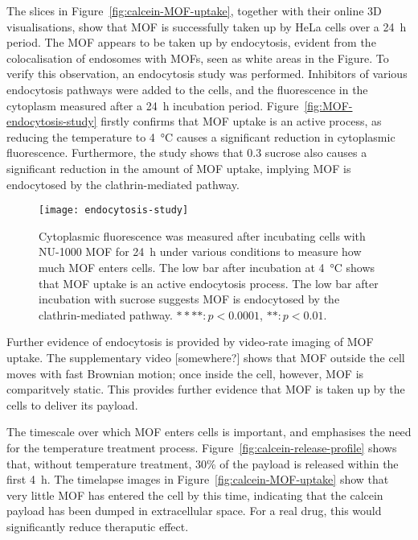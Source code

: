 The slices in Figure~\ref{fig:calcein-MOF-uptake}, together with their online 3D visualisations, show that MOF is successfully taken up by HeLa cells over a \SI{24}{\hour} period. 
The MOF appears to be taken up by endocytosis, evident from the colocalisation of endosomes with MOFs, seen as white areas in the Figure. 
To verify this observation, an endocytosis study was performed.
Inhibitors of various endocytosis pathways were added to the cells, and the fluorescence in the cytoplasm measured after a \SI{24}{\hour} incubation period. 
Figure~\ref{fig:MOF-endocytosis-study} firstly confirms that MOF uptake is an active process, as reducing the temperature to \SI{4}{\degreeCelsius} causes a significant reduction in cytoplasmic fluorescence. 
Furthermore, the study shows that \SI{0.3}{\Molar} sucrose also causes a significant reduction in the amount of MOF uptake, implying MOF is endocytosed by the clathrin-mediated pathway. 

\begin{figure}[htbp!]
\centering
\texttt{[image: endocytosis-study]}
\caption[MOFs: An endocytosis study shows NU-1000 MOF is taken up by HeLa cells through the clathrin-mediated pathway]{Cytoplasmic fluorescence was measured after incubating cells with NU-1000 MOF for \SI{24}{\hour} under various conditions to measure how much MOF enters cells. The low bar after incubation at \SI{4}{\degreeCelsius} shows that MOF uptake is an active endocytosis process. The low bar after incubation with sucrose suggests MOF is endocytosed by the clathrin-mediated pathway. $****: p<0.0001$, $**: p<0.01$. }
\label{fig:endocytosis-study}
\end{figure}

Further evidence of endocytosis is provided by video-rate imaging of MOF uptake.
The supplementary video [somewhere?] shows that MOF outside the cell moves with fast Brownian motion; once inside the cell, however, MOF is comparitvely static. 
This provides further evidence that MOF is taken up by the cells to deliver its payload. 

The timescale over which MOF enters cells is important, and emphasises the need for the temperature treatment process. 
Figure~\ref{fig:calcein-release-profile} shows that, without temperature treatment, 30\% of the payload is released within the first \SI{4}{\hour}. 
The timelapse images in Figure~\ref{fig:calcein-MOF-uptake} show that very little MOF has entered the cell by this time, indicating that the calcein payload has been dumped in extracellular space. 
For a real drug, this would significantly reduce theraputic effect. %


